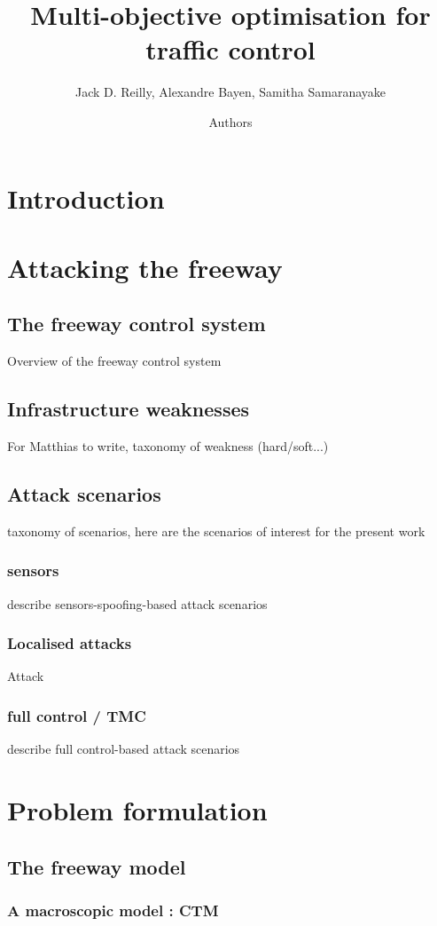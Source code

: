 \documentclass{article}
\title{Multi-objective optimisation for traffic control}
\author{Jack D. Reilly, Alexandre Bayen, Samitha Samaranayake}
\author{Authors}
\date{}							%
\begin{document}
\maketitle
\tableofcontents

\section*{Introduction}
\section{Attacking the freeway}
	\subsection{The freeway control system}
		Overview of the freeway control system
	\subsection{Infrastructure weaknesses}
		For Matthias to write, taxonomy of weakness (hard/soft...)
	\subsection{Attack scenarios}
		taxonomy of scenarios, here are the scenarios of interest for the present work
		\subsubsection{sensors}
			describe sensors-spoofing-based attack scenarios
		\subsubsection{Localised attacks}
			Attack
		\subsubsection{full control / TMC}
			describe full control-based attack scenarios
\section{Problem formulation}			
	\subsection{The freeway model}
		\subsubsection{A macroscopic model : CTM}
\end{document}
